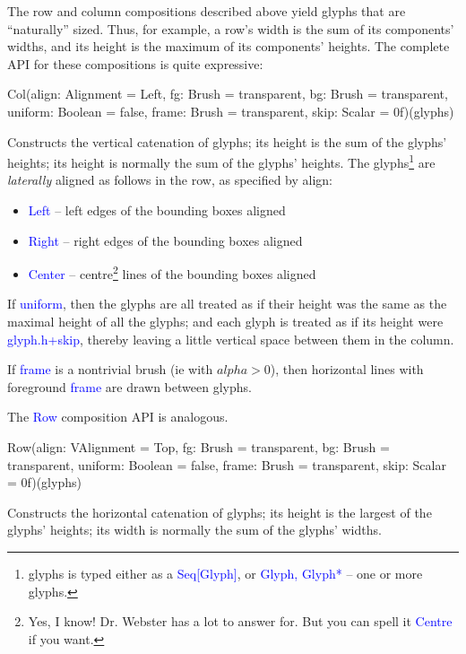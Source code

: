 \documentclass[12pt,a4paper]{article}
\def\Scala#1{\textcolor{blue}{\textsf{#1}}}
\begin{document}
The row and column compositions described above yield glyphs that
are ``naturally'' sized. Thus, for example, a row's width is the
sum of its components' widths, and its height is the maximum of its
components' heights. The complete API for these compositions is quite
expressive:
\begin{scala}
   Col(align:   Alignment = Left,
       fg:      Brush     = transparent,
       bg:      Brush     = transparent,
       uniform: Boolean   = false,
       frame:   Brush     = transparent,
       skip:    Scalar    = 0f)(glyphs)
\end{scala}
Constructs the vertical catenation of glyphs; its height is the sum of the
glyphs' heights; its height is normally the sum of the glyphs' heights.
The glyphs\footnote{glyphs is typed either as a \Scala{Seq[Glyph]}, or
\Scala{Glyph, Glyph*} -- one or more
glyphs.} are \textit{laterally} aligned as follows in the row, as specified
by align:

\begin{itemize}
\item \Scala{Left}   --   left edges of the bounding boxes aligned
\item \Scala{Right}  --   right edges of the bounding boxes aligned
\item \Scala{Center}  --  centre\footnote{Yes, I know!
Dr. Webster has a lot to answer for. But you can spell it
\Scala{Centre} if you want.} lines of the bounding boxes aligned
\end{itemize}

If \Scala{uniform}, then the glyphs are all treated as if their
height was the same as the maximal height of all the glyphs; and
each glyph is treated as if its height were \Scala{glyph.h+skip}, thereby
leaving a little vertical space between them in the column.

If \Scala{frame} is a nontrivial brush (ie with $alpha>0$), then horizontal lines
with foreground \Scala{frame} are drawn between glyphs.

The \Scala{Row} composition API is analogous.
\begin{scala}
   Row(align:   VAlignment = Top,
       fg:      Brush      = transparent,
       bg:      Brush      = transparent,
       uniform: Boolean    = false,
       frame:   Brush      = transparent,
       skip:    Scalar     = 0f)(glyphs)
\end{scala}

Constructs the horizontal catenation of glyphs; its height is the
largest of the glyphs' heights; its width is normally the sum of
the glyphs' widths.
\end{document}
